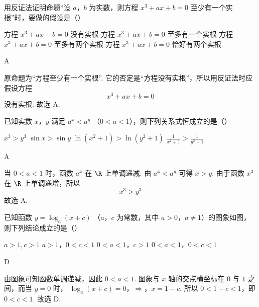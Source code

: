 \begin{problem}
用反证法证明命题“设 \(a\)，\(b\) 为实数，则方程 \(x^3 + ax + b = 0\) 至少有一个实根”时，要做的假设是（\quad）

\choices
    {方程 \( x^{3} + ax + b = 0 \) 没有实根}
    {方程 \(x^{3} + ax + b = 0\) 至多有一个实根}
    {方程 \(x^{3} + ax + b = 0\) 至多有两个实根}
    {方程 \(x^{3} + ax + b = 0\) 恰好有两个实根}
\end{problem}

\begin{answer}
A
\end{answer}

\begin{solution}
原命题为“方程至少有一个实根”. 它的否定是“方程没有实根”，所以用反证法时应假设方程
\[
x^3+ax+b=0
\]
没有实根.
故选 A.
\end{solution}

\begin{problem}
已知实数 \(x\)，\(y\) 满足 \(a^x < a^y\) （\(0 < a < 1\)），则下列关系式恒成立的是（\quad）

\choices
    {\(x^3 > y^3\)}
    {\(\sin x > \sin y\)}
    {\(\ln (x^2 + 1) > \ln (y^2 + 1)\)}
    {\(\frac{1}{x^2 + 1} >\frac{1}{y^2 + 1}\)}
\end{problem}

\begin{answer}
A
\end{answer}

\begin{solution}
当 \(0<a<1\) 时，函数 \(a^x\) 在 \(\R\) 上单调递减. 由 \(a^x<a^y\) 可得 \(x>y\). 由于函数 \(x^3\) 在 \(\R\) 上单调递增，所以
\[
x^3>y^3
\]
故选 A.
\end{solution}

\begin{problem}
已知函数 \( y = \log_a (x + c) \) （\(a\)，\(c\) 为常数，其中 \(a > 0\)，\(a \neq 1\)）的图象如图，则下列结论成立的是（\quad）


\choices
    {\(a > 1, c > 1\)}
    {\(a > 1\)，\(0 < c < 1\)}
    {\(0 < a < 1\)，\(c > 1\)}
    {\(0 < a < 1\)，\(0 < c < 1\)}
\end{problem}

\begin{answer}
D
\end{answer}

\begin{solution}
由图象可知函数单调递减，因此 \(0<a<1\). 图象与 \(x\) 轴的交点横坐标在 \(0\) 与 \(1\) 之间，而当 \(y=0\) 时，
\(\log_a(x+c)=0\)，\(\Longrightarrow\)，\(x=1-c\).
所以 \(0<1-c<1\)，即 \(0<c<1\). 故选 D.
\end{solution}

